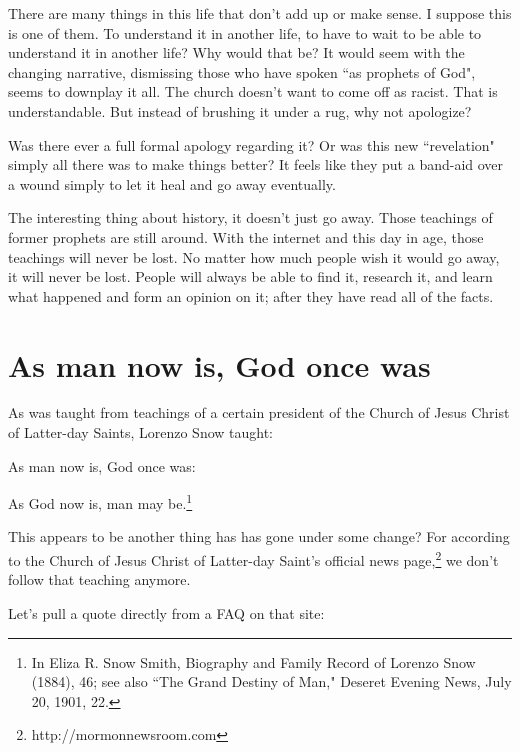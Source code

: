 \documentclass{article}
\begin{document}
There are many things in this life that don't add up or make sense. I suppose
this is one of them. To understand it in another life, to have to wait to be 
able to understand it in another life? Why would that be? It would seem with
the changing narrative, dismissing those who have spoken ``as prophets of God",
seems to downplay it all. The church doesn't want to come off as racist. That
is understandable. But instead of brushing it under a rug, why not apologize?

Was there ever a full formal apology regarding it? Or was this new ``revelation"
simply all there was to make things better? It feels like they put a band-aid
over a wound simply to let it heal and go away eventually.

The interesting thing about history, it doesn't just go away. Those teachings
of former prophets are still around. With the internet and this day in age,
those teachings will never be lost. No matter how much people wish it would go
away, it will never be lost. People will always be able to find it, research it,
and learn what happened and form an opinion on it; after they have read all of
the facts.

\newpage

\section{As man now is, God once was}

As was taught from teachings of a certain president of the Church of Jesus
Christ of Latter-day Saints, Lorenzo Snow taught:

\begin{displayquote}
As man now is, God once was:

As God now is, man may be.\footnote{In Eliza R. Snow Smith, Biography and 
Family Record of Lorenzo Snow (1884), 46; see also ``The Grand Destiny of Man," 
Deseret Evening News, July 20, 1901, 22.}
\end{displayquote}

This appears to be another thing has has gone under some change? For according
to the Church of Jesus Christ of Latter-day Saint's official news 
page,\footnote{http://mormonnewsroom.com} we don't follow that teaching anymore.

Let's pull a quote directly from a FAQ on that site:
\end{document}
